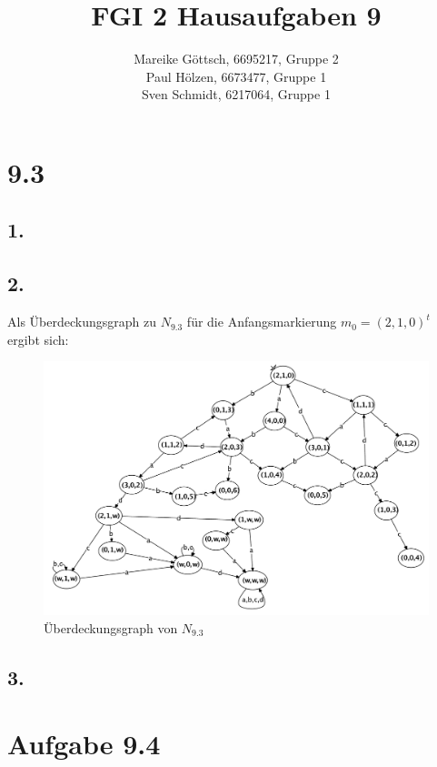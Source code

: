 \documentclass[12pt, paper=a4]{article}
\author{Mareike G\"ottsch, 6695217, Gruppe 2\\Paul H\"olzen, 6673477, Gruppe 1\\Sven Schmidt, 6217064, Gruppe 1}
\title{FGI 2 Hausaufgaben 9}
\begin{document}
\maketitle
\section*{9.3}

\subsection*{1.}
\subsection*{2.}
Als \"Uberdeckungsgraph zu \(N_{9.3}\) f\"ur die Anfangsmarkierung \(m_0=(2,1,0)^t\) ergibt sich:
\begin{figure}[h!]
	\centering
	\includegraphics[scale=0.35]{9_3_2.pdf}
	\caption{\"Uberdeckungsgraph von \(N_{9.3}\)}
\end{figure}

\subsection*{3.}


\section*{Aufgabe 9.4}
\end{document}
